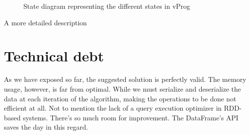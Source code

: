 \begin{figure}[H]
    \centering
    
    \caption[ State diagram representing the different states in vProg
    ]{ State diagram representing the different states in vProg
        ~\cite{https://doi.org/10.48550/arxiv.2110.11709}}
    \label{fig:state:pregel}
\end{figure}

A more detailed description

\begin{center}
    
\end{center}


\section{Technical debt}

As we have exposed so far, the suggested solution is perfectly valid. The memory usage, however, is far from optimal. While we must serialize and deserialize the data at each iteration of the algorithm, making the operations to be done not efficient at all. Not to mention the lack of a query execution optimizer in RDD-based systems. There's so much room for improvement. The DataFrame's API saves the day in this regard.